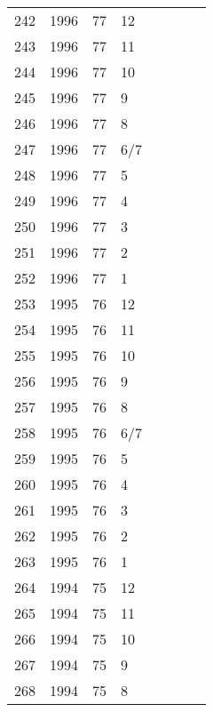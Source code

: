 \begin{longtable}{ |l|l|l|l|l|l|l|l| }
242 & 1996 & 77 &    12 &         &                &  & \\
243 & 1996 & 77 &    11 &         &                &  & \\
244 & 1996 & 77 &    10 &         &                &  & \\
245 & 1996 & 77 &     9 &         &                &  & \\
246 & 1996 & 77 &     8 &         &                &  & \\
247 & 1996 & 77 &   6/7 &         &                &  & \\
248 & 1996 & 77 &     5 &         &                &  & \\
249 & 1996 & 77 &     4 &         &                &  & \\
250 & 1996 & 77 &     3 &         &                &  & \\
251 & 1996 & 77 &     2 &         &                &  & \\
252 & 1996 & 77 &     1 &         &                &  & \\
253 & 1995 & 76 &    12 &         &                &  & \\
254 & 1995 & 76 &    11 &         &                &  & \\
255 & 1995 & 76 &    10 &         &                &  & \\
256 & 1995 & 76 &     9 &         &                &  & \\
257 & 1995 & 76 &     8 &         &                &  & \\
258 & 1995 & 76 &   6/7 &         &                &  & \\
259 & 1995 & 76 &     5 &         &                &  & \\
260 & 1995 & 76 &     4 &         &                &  & \\
261 & 1995 & 76 &     3 &         &                &  & \\
262 & 1995 & 76 &     2 &         &                &  & \\
263 & 1995 & 76 &     1 &         &                &  & \\
264 & 1994 & 75 &    12 &         &                &  & \\
265 & 1994 & 75 &    11 &         &                &  & \\
266 & 1994 & 75 &    10 &         &                &  & \\
267 & 1994 & 75 &     9 &         &                &  & \\
268 & 1994 & 75 &     8 &         &                &  & \\

\end{longtable}
